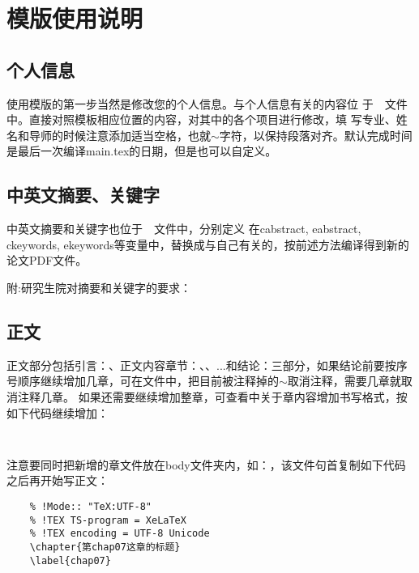 \rhead{\kai\wuhao \kai\wuhao\leftmark}
\chapter{模版使用说明}
\label{chap01}

\section{个人信息}
使用模版的第一步当然是修改您的个人信息。与个人信息有关的内容位
于~~文件中。直接对照模板相应位置的内容，对其中的各个项目进行修改，填
写专业、姓名和导师的时候注意添加适当空格，也就$\sim$字符，以保持段落对齐。默认完成时间是最后一次编译main.tex的日期，但是也可以自定义。

\section{中英文摘要、关键字}
中英文摘要和关键字也位于~~文件中，分别定义
在cabstract, eabstract, ckeywords, ekeywords等变量中，替换成与自己有关的，按前述方法编译得到新的论文PDF文件。

附:研究生院对摘要和关键字的要求：\song

\section{正文}
正文部分包括引言：、正文内容章节：、、...和结论：三部分，如果结论前要按序号顺序继续增加几章，可在文件中，把目前被注释掉的$\sim$取消注释，需要几章就取消注释几章。
如果还需要继续增加整章，可查看中关于章内容增加书写格式，按如下代码继续增加：
\begin{lstlisting}
	
\end{lstlisting}
注意要同时把新增的章文件放在body文件夹内，如：，该文件句首复制如下代码之后再开始写正文：
\begin{lstlisting}
	% !Mode:: "TeX:UTF-8"
	% !TEX TS-program = XeLaTeX
	% !TEX encoding = UTF-8 Unicode	
	\chapter{第chap07这章的标题}
	\label{chap07}
\end{lstlisting}

